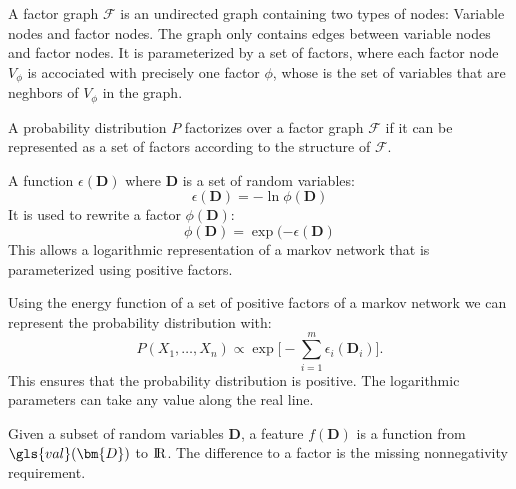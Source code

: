 {%
  A factor graph $\mathcal{F}$ is an undirected \gls{graph} containing two types of \glspl{node}: Variable nodes and factor nodes. The graph only contains \glspl{edge} between variable nodes and factor nodes. It is parameterized by a set of \glspl{factor}, where each factor node $V_\phi$ is accociated with precisely one factor $\phi$, whose  is the set of variables that are neghbors of $V_\phi$ in the graph.
}

{%
  A \gls{probability distribution} $P$ factorizes over a \gls{factor graph} $\mathcal{F}$ if it can be represented as a set of \glspl{factor} according to the structure of $\mathcal{F}$.
}

{%
  A \gls{function} $\epsilon(\bm{D})$ where $\bm{D}$ is a \gls{set of random variables}:
  \begin{equation*}
    \epsilon(\bm{D})=-\ln\phi(\bm{D})
  \end{equation*}
  It is used to rewrite a \gls{factor} $\phi(\bm{D})$:
  \begin{equation*}
    \phi(\bm{D})=\exp(-\epsilon(\bm{D})
  \end{equation*}
  This allows a \gls{logarithmic representation} of a \gls{markov network} that is parameterized using positive \glspl{factor}.
}

{%
  Using the \gls{energy function} of a set of positive \glspl{factor} of a \gls{markov network} we can represent the \gls{probability distribution} with:
  \begin{equation*}
    P(X_1,\dots,X_n)\propto\exp \Bigg[ -\sum_{i=1}^m \epsilon_i(\bm{D}_i) \Bigg] .
  \end{equation*}
  This ensures that the probability distribution is positive. The logarithmic parameters can take any value along the real line.

}

{%
  Given a subset of \glspl{random variable} $\bm{D}$, a feature $f(\bm{D})$ is a \gls{function} from $\gls{val}(\bm{D})$ to $\operatorname*{{\rm I\!R}}$. The difference to a \gls{factor} is the missing nonnegativity requirement.
}

